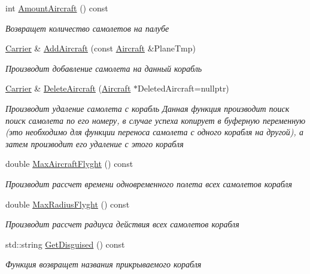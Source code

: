 \begin{DoxyCompactItemize}
int \mbox{\hyperlink{class_aircraft_carrier_group_1_1_carrier_abd7c7342ef057fc1d14ec9296631cce8}{Amount\+Aircraft}} () const
\begin{DoxyCompactList}\small\item\em Возвращет количество самолетов на палубе \end{DoxyCompactList}\item 
\mbox{\hyperlink{class_aircraft_carrier_group_1_1_carrier}{Carrier}} \& \mbox{\hyperlink{class_aircraft_carrier_group_1_1_carrier_ac85afb17582997d9e5956ff89d22a1e6}{Add\+Aircraft}} (const \mbox{\hyperlink{class_aircraft_carrier_group_1_1_aircraft}{Aircraft}} \&Plane\+Tmp)
\begin{DoxyCompactList}\small\item\em Производит добавление самолета на данный корабль \end{DoxyCompactList}\item 
\mbox{\hyperlink{class_aircraft_carrier_group_1_1_carrier}{Carrier}} \& \mbox{\hyperlink{class_aircraft_carrier_group_1_1_carrier_a23f5d495e4bb570a8abb7ee08cce2d12}{Delete\+Aircraft}} (\mbox{\hyperlink{class_aircraft_carrier_group_1_1_aircraft}{Aircraft}} $\ast$Deleted\+Aircraft=nullptr)
\begin{DoxyCompactList}\small\item\em Производит удаление самолета с корабль  Данная функция производит поиск поиск самолета по его номеру, в случае успеха копирует в буферную переменную (это необходимо для функции переноса самолета с одного корабля на другой), а затем производит его удаление с этого корабля \end{DoxyCompactList}\item 
\mbox{\label{class_aircraft_carrier_group_1_1_carrier_a221150a9fd68865af18d06bf14bb052d}} 
double \mbox{\hyperlink{class_aircraft_carrier_group_1_1_carrier_a221150a9fd68865af18d06bf14bb052d}{Max\+Aircraft\+Flyght}} () const
\begin{DoxyCompactList}\small\item\em Производит рассчет времени одновременного полета всех самолетов корабля \end{DoxyCompactList}\item 
\mbox{\label{class_aircraft_carrier_group_1_1_carrier_a6f0ad3fe4f9a7e7afc16501bed38dd6b}} 
double \mbox{\hyperlink{class_aircraft_carrier_group_1_1_carrier_a6f0ad3fe4f9a7e7afc16501bed38dd6b}{Max\+Radius\+Flyght}} () const
\begin{DoxyCompactList}\small\item\em Производит рассчет радиуса действия всех самолетов корабля \end{DoxyCompactList}\item 
std\+::string \mbox{\hyperlink{class_aircraft_carrier_group_1_1_carrier_a5540afe1e3ed0c42d299d3a6dd230585}{Get\+Disguised}} () const
\begin{DoxyCompactList}\small\item\em Функция возвращет названия прикрываемого корабля \end{DoxyCompactList}\end{DoxyCompactItemize}
